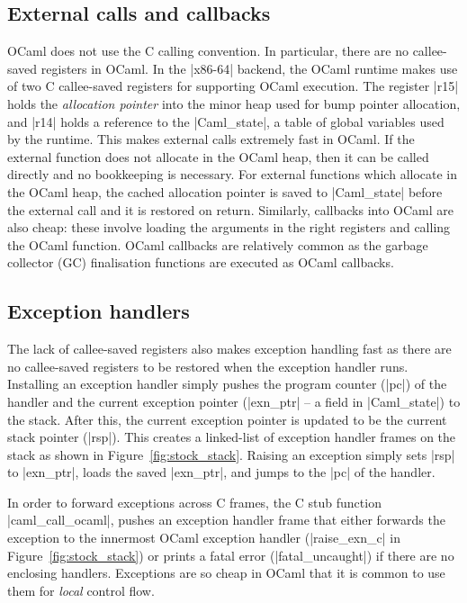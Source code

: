 \documentclass[sigplan,screen]{acmart}
\begin{document}
\subsection{External calls and callbacks}
\label{sec:external}

OCaml does not use the C calling convention. In particular, there are no
callee-saved registers in OCaml. In the |x86-64| backend, the OCaml runtime
makes use of two C callee-saved registers for supporting OCaml execution. The
register |r15| holds the \emph{allocation pointer} into the minor heap used for
bump pointer allocation, and |r14| holds a reference to the |Caml_state|, a
table of global variables used by the runtime. This makes external calls
extremely fast in OCaml. If the external function does not allocate in the
OCaml heap, then it can be called directly and no bookkeeping is necessary. For
external functions which allocate in the OCaml heap, the cached allocation
pointer is saved to |Caml_state| before the external call and it is restored on
return. Similarly, callbacks into OCaml are also cheap: these involve loading
the arguments in the right registers and calling the OCaml function. OCaml
callbacks are relatively common as the garbage collector (GC) finalisation
functions are executed as OCaml callbacks.

\subsection{Exception handlers}
\label{sec:exn_handlers}

The lack of callee-saved registers also makes exception handling fast as there
are no callee-saved registers to be restored when the exception handler runs.
Installing an exception handler simply pushes the program counter (|pc|) of the
handler and the current exception pointer (|exn_ptr| -- a field in
|Caml_state|) to the stack. After this, the current exception pointer is
updated to be the current stack pointer (|rsp|). This creates a linked-list of
exception handler frames on the stack as shown in Figure~\ref{fig:stock_stack}.
Raising an exception simply sets |rsp| to |exn_ptr|, loads the saved |exn_ptr|,
and jumps to the |pc| of the handler.


In order to forward exceptions across C frames, the C stub function
|caml_call_ocaml|, pushes an exception handler frame that either forwards the
exception to the innermost OCaml exception handler (|raise_exn_c| in
Figure~\ref{fig:stock_stack}) or prints a fatal error (|fatal_uncaught|) if
there are no enclosing handlers. Exceptions are so cheap in OCaml that it is
common to use them for \emph{local} control flow.
\end{document}
